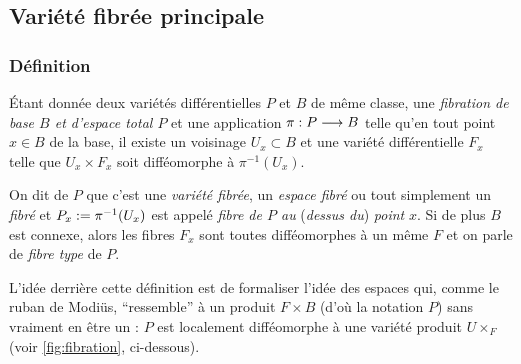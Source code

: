 \subsection{Variété fibrée principale}

\subsubsection{Définition}

\begin{definition}
	\'Etant donnée deux variétés différentielles $P$ et $B$ de même classe, une \emph{fibration de base $B$ et d'espace total $P$} et une application $\pi : P\longrightarrow B$ telle qu'en tout point $x\in B$ de la base, il existe un voisinage $U_x\subset B$ et une variété différentielle $F_x$ telle que $U_x\times F_x$ soit difféomorphe à $\pi^{-1}(U_x)$.
	
	On dit de $P$ que c'est une \emph{variété fibrée}, un \emph{espace fibré} ou tout simplement un \emph{fibré} et $P_x := \pi^{-1}(U_x)$ est appelé \emph{fibre de $P$ au} (\emph{dessus du}) \emph{point} $x$.
	Si de plus $B$ est connexe, alors les fibres $F_x$ sont toutes difféomorphes à un même $F$ et on parle de \emph{fibre type} de $P$.
\end{definition}
\skipl

L'idée derrière cette définition est de formaliser l'idée des espaces qui, comme le ruban de Modiüs, ``ressemble'' à un produit $F\times B$ (d'où la notation $P$) sans vraiment en être un : $P$ est localement difféomorphe à une variété produit $U\times_F$ (voir \cref{fig:fibration}, ci-dessous).

